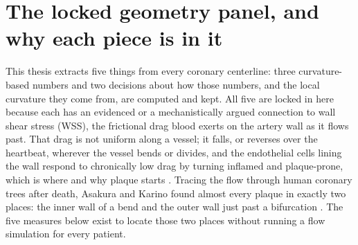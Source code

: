 %
%
%

\section*{The locked geometry panel, and why each piece is in it}

This thesis extracts five things from every coronary centerline: three curvature-based numbers and
two decisions about how those numbers, and the local curvature they come from, are computed and
kept. All five are locked in here because each has an evidenced or a mechanistically argued
connection to wall shear stress (WSS), the frictional drag blood exerts on the artery wall as it
flows past. That drag is not uniform along a vessel; it falls, or reverses over the heartbeat,
wherever the vessel bends or divides, and the endothelial cells lining the wall respond to
chronically low drag by turning inflamed and plaque-prone, which is where and why plaque starts
\cite{chatzizisis2007ess}. Tracing the flow through human coronary trees after death, Asakura and
Karino found almost every plaque in exactly two places: the inner wall of a bend and the outer wall
just past a bifurcation \cite{asakura1990flow}. The five measures below exist to locate those two
places without running a flow simulation for every patient.

